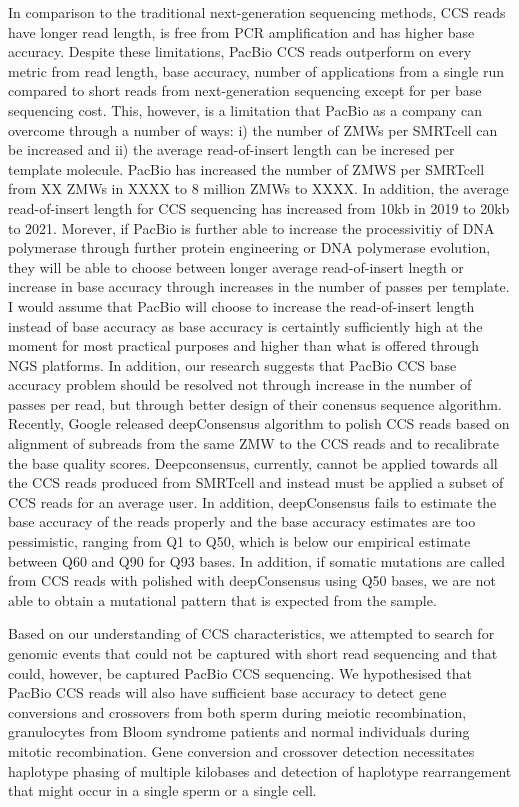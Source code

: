 In comparison to the traditional next-generation sequencing methods, CCS reads have longer read length, is free from PCR amplification and has higher base accuracy. Despite these limitations, PacBio CCS reads outperform on every metric from read length, base accuracy, number of applications from a single run compared to short reads from next-generation sequencing except for per base sequencing cost. This, however, is a limitation that PacBio as a company can overcome through a number of ways: i) the number of ZMWs per SMRTcell can be increased and ii) the average read-of-insert length can be incresed per template molecule. PacBio has increased the number of ZMWS per SMRTcell from XX ZMWs in XXXX to 8 million ZMWs to XXXX. In addition, the average read-of-insert length for CCS sequencing has increased from 10kb in 2019 to 20kb to 2021. Morever, if PacBio is further able to increase the processivitiy of DNA polymerase through further protein engineering or DNA polymerase evolution, they will be able to choose between longer average read-of-insert lnegth or increase in base accuracy through increases in the number of passes per template. I would assume that PacBio will choose to increase the read-of-insert length instead of base accuracy as base accuracy is certaintly sufficiently high at the moment for most practical purposes and higher than what is offered through NGS platforms. In addition, our research suggests that PacBio CCS base accuracy problem should be resolved not through increase in the number of passes per read, but through better design of their conensus sequence algorithm. Recently, Google released deepConsensus algorithm to polish CCS reads based on alignment of subreads from the same ZMW to the CCS reads and to recalibrate the base quality scores. Deepconsensus, currently, cannot be applied towards all the CCS reads produced from SMRTcell and instead must be applied a subset of CCS reads for an average user. In addition, deepConsensus fails to estimate the base accuracy of the reads properly and the base accuracy estimates are too pessimistic, ranging from Q1 to Q50, which is below our empirical estimate between Q60 and Q90 for Q93 bases. In addition, if somatic mutations are called from CCS reads with polished with deepConsensus using Q50 bases, we are not able to obtain a mutational pattern that is expected from the sample.


Based on our understanding of CCS characteristics, we attempted to search for genomic events that could not be captured with short read sequencing and that could, however, be captured PacBio CCS sequencing. We hypothesised that PacBio CCS reads will also have sufficient base accuracy to detect gene conversions and crossovers from both sperm during meiotic recombination, granulocytes from Bloom syndrome patients and normal individuals during mitotic recombination. Gene conversion and crossover detection necessitates haplotype phasing of multiple kilobases and detection of haplotype rearrangement that might occur in a single sperm or a single cell.


